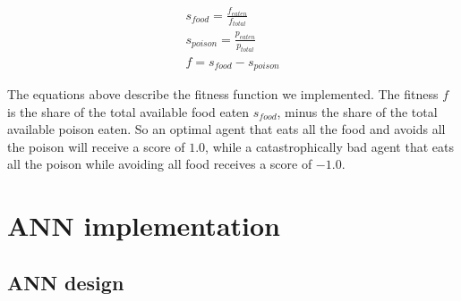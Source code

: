 \documentclass[twoside]{article}
\begin{document}
\begin{multicols}{2}
  \begin{gather*}
    s_{food} = \frac{f_{eaten}}{f_{total}} \\[10pt]
    s_{poison} = \frac{p_{eaten}}{p_{total}} \\[10pt]
    f = s_{food} - s_{poison}
  \end{gather*}

  The equations above describe the fitness function we implemented.
  The fitness $f$ is the share of the total available food eaten $s_{food}$, minus the share of the total available poison eaten.
  So an optimal agent that eats all the food and avoids all the poison will receive a score of $1.0$, while a catastrophically bad agent that eats all the poison while avoiding all food receives a score of $-1.0$.

  \section{ANN implementation}

  \subsection{ANN design}

  \def\layersep{2.0cm}

  \begin{figure}[H]
    \centering
\end{figure}
\end{multicols}
\end{document}
